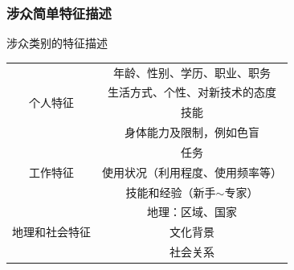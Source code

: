 \subsubsection{涉众简单特征描述}
涉众类别的特征描述
\begin{table}[H]
    \centering
    \begin{tabular}{|c|c|}
    \hline
    \multirow{4}{*}{个人特征}    & 年龄、性别、学历、职业、职务    \\ \cline{2-2} 
                             & 生活方式、个性、对新技术的态度   \\ \cline{2-2} 
                             & 技能                \\ \cline{2-2} 
                             & 身体能力及限制，例如色盲      \\ \hline
    \multirow{3}{*}{工作特征}    & 任务                \\ \cline{2-2} 
                             & 使用状况（利用程度、使用频率等）  \\ \cline{2-2} 
                             & 技能和经验（新手$\sim$专家） \\ \hline
    \multirow{3}{*}{地理和社会特征} & 地理：区域、国家          \\ \cline{2-2} 
                             & 文化背景              \\ \cline{2-2} 
                             & 社会关系              \\ \hline
    \end{tabular}
\end{table}

